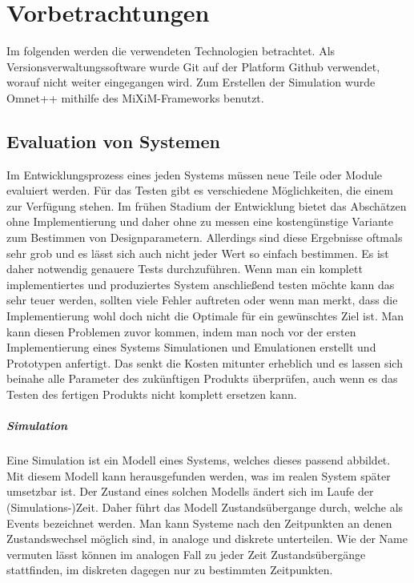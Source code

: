 \chapter{Vorbetrachtungen}

Im folgenden werden die verwendeten Technologien betrachtet. Als Versionsverwaltungssoftware wurde Git\cite{git} auf der Platform Github\cite{github} verwendet, worauf nicht weiter eingegangen wird. Zum Erstellen der Simulation wurde Omnet++\cite{omnet} mithilfe des MiXiM-Frameworks\cite{mixim} benutzt.

\section{Evaluation von Systemen}

Im Entwicklungsprozess eines jeden Systems müssen neue Teile oder Module evaluiert werden. Für das Testen gibt es verschiedene Möglichkeiten, die einem zur Verfügung stehen. Im frühen Stadium der Entwicklung bietet das Abschätzen ohne Implementierung und daher ohne zu messen eine kostengünstige Variante zum Bestimmen von Designparametern. Allerdings sind diese Ergebnisse oftmals sehr grob und es lässt sich auch nicht jeder Wert so einfach bestimmen. \newline
Es ist daher notwendig genauere Tests durchzuführen. Wenn man ein komplett implementiertes und produziertes System anschließend testen möchte kann das sehr teuer werden, sollten viele Fehler auftreten oder wenn man merkt, dass die Implementierung wohl doch nicht die Optimale für ein gewünschtes Ziel ist. \newline
Man kann diesen Problemen zuvor kommen, indem man noch vor der ersten Implementierung eines Systems Simulationen und Emulationen erstellt und Prototypen anfertigt. Das senkt die Kosten mitunter erheblich und es lassen sich beinahe alle Parameter des zukünftigen Produkts überprüfen, auch wenn es das Testen des fertigen Produkts nicht komplett ersetzen kann.


\paragraph{Simulation}

Eine Simulation ist ein Modell eines Systems, welches dieses passend abbildet. Mit diesem Modell kann herausgefunden werden, was im realen System später umsetzbar ist. Der Zustand eines solchen Modells ändert sich im Laufe der (Simulations-)Zeit. Daher führt das Modell Zustandsübergange durch, welche als Events bezeichnet werden. Man kann Systeme nach den Zeitpunkten an denen Zustandswechsel möglich sind, in analoge und diskrete unterteilen. Wie der Name vermuten lässt können im analogen Fall zu jeder Zeit Zustandsübergänge stattfinden, im diskreten dagegen nur zu bestimmten Zeitpunkten.


